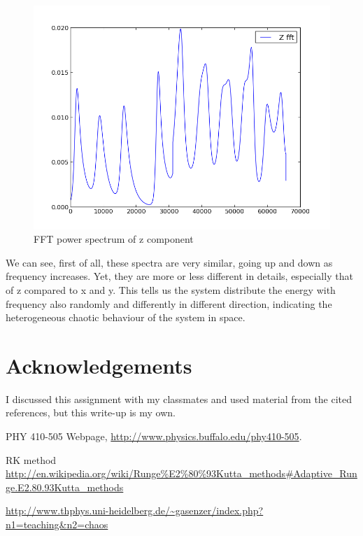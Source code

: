 \documentclass[11pt,letterpaper]{article}
\begin{document}
\begin{figure}
\begin{center}
\includegraphics[width=0.8\linewidth,angle=0]{fftz.png}
\caption{FFT power spectrum of z component}
\label{figure7}
\end{center}
\end{figure}

We can see, first of all, these spectra are very similar, going up and down as frequency increases. Yet, they are more or less different in details, especially that of z compared to x and y. This tells us the system distribute the energy with frequency also randomly and differently in different direction, indicating the heterogeneous chaotic behaviour of the system in space.

\newpage
\section*{Acknowledgements}

I discussed this assignment with my classmates and used material from the
cited references, but this write-up is my own.

\begin{thebibliography}{9}


PHY 410-505 Webpage, \url{http://www.physics.buffalo.edu/phy410-505}.



RK method
\url{http://en.wikipedia.org/wiki/Runge%E2%80%93Kutta_methods#Adaptive_Runge.E2.80.93Kutta_methods}

\url{http://www.thphys.uni-heidelberg.de/~gasenzer/index.php?n1=teaching&n2=chaos}

\end{thebibliography}
\end{document}

